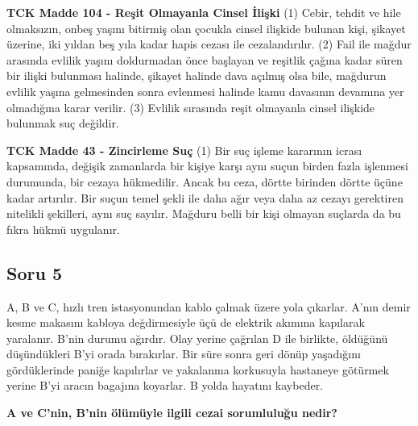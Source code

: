 \documentclass[a4paper, 11pt, twocolumn]{article}
\newenvironment{lawbox}{%
    \par\noindent
    \begin{tcolorbox}[
        colback=lawbg,
        colframe=boxcolor,
        fonttitle=\bfseries,
        boxrule=0.5pt,
        left=3pt,
        right=3pt,
        top=3pt,
        bottom=3pt,
        width=\columnwidth,
        arc=2pt,
        before skip=0.2cm,
        after skip=0.2cm
    ]
    \footnotesize\itshape
}{\end{tcolorbox}}
\begin{document}
\begin{lawbox}
\textbf{TCK Madde 104 - Reşit Olmayanla Cinsel İlişki}
\newline
(1) Cebir, tehdit ve hile olmaksızın, onbeş yaşını bitirmiş olan çocukla cinsel ilişkide bulunan kişi, şikayet üzerine, iki yıldan beş yıla kadar hapis cezası ile cezalandırılır.
\newline
(2) Fail ile mağdur arasında evlilik yaşını doldurmadan önce başlayan ve reşitlik çağına kadar süren bir ilişki bulunması halinde, şikayet halinde dava açılmış olsa bile, mağdurun evlilik yaşına gelmesinden sonra evlenmesi halinde kamu davasının devamına yer olmadığına karar verilir.
\newline
(3) Evlilik sırasında reşit olmayanla cinsel ilişkide bulunmak suç değildir.
\end{lawbox}
\begin{lawbox}
\textbf{TCK Madde 43 - Zincirleme Suç}
\newline
(1) Bir suç işleme kararının icrası kapsamında, değişik zamanlarda bir kişiye karşı aynı suçun birden fazla işlenmesi durumunda, bir cezaya hükmedilir. Ancak bu ceza, dörtte birinden dörtte üçüne kadar artırılır. Bir suçun temel şekli ile daha ağır veya daha az cezayı gerektiren nitelikli şekilleri, aynı suç sayılır. Mağduru belli bir kişi olmayan suçlarda da bu fıkra hükmü uygulanır.
\end{lawbox}

\newpage

\subsection*{Soru 5}
A, B ve C, hızlı tren istasyonundan kablo çalmak üzere yola çıkarlar. A'nın demir kesme makasını kabloya değdirmesiyle üçü de elektrik akımına kapılarak yaralanır. B'nin durumu ağırdır. Olay yerine çağrılan D ile birlikte, öldüğünü düşündükleri B'yi orada bırakırlar. Bir süre sonra geri dönüp yaşadığını gördüklerinde paniğe kapılırlar ve yakalanma korkusuyla hastaneye götürmek yerine B'yi aracın bagajına koyarlar. B yolda hayatını kaybeder.

\textbf{A ve C'nin, B'nin ölümüyle ilgili cezai sorumluluğu nedir?}
\end{document}
